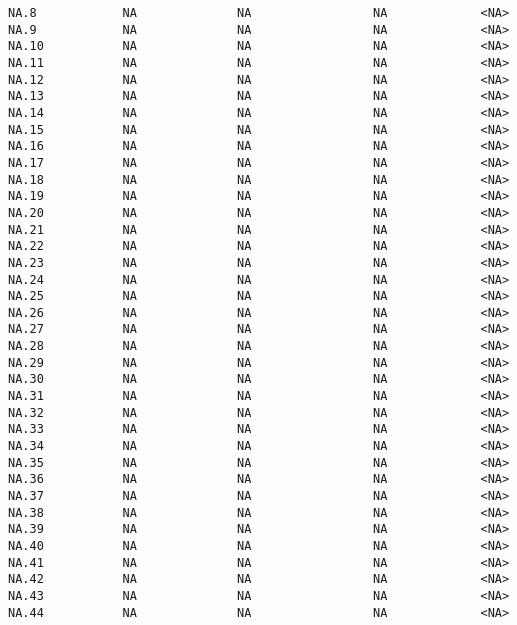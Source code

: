 \documentclass[
  letterpaper,
  DIV=11,
  numbers=noendperiod]{scrartcl}
\begin{document}
\begin{verbatim}
NA.8            NA              NA                 NA             <NA>
NA.9            NA              NA                 NA             <NA>
NA.10           NA              NA                 NA             <NA>
NA.11           NA              NA                 NA             <NA>
NA.12           NA              NA                 NA             <NA>
NA.13           NA              NA                 NA             <NA>
NA.14           NA              NA                 NA             <NA>
NA.15           NA              NA                 NA             <NA>
NA.16           NA              NA                 NA             <NA>
NA.17           NA              NA                 NA             <NA>
NA.18           NA              NA                 NA             <NA>
NA.19           NA              NA                 NA             <NA>
NA.20           NA              NA                 NA             <NA>
NA.21           NA              NA                 NA             <NA>
NA.22           NA              NA                 NA             <NA>
NA.23           NA              NA                 NA             <NA>
NA.24           NA              NA                 NA             <NA>
NA.25           NA              NA                 NA             <NA>
NA.26           NA              NA                 NA             <NA>
NA.27           NA              NA                 NA             <NA>
NA.28           NA              NA                 NA             <NA>
NA.29           NA              NA                 NA             <NA>
NA.30           NA              NA                 NA             <NA>
NA.31           NA              NA                 NA             <NA>
NA.32           NA              NA                 NA             <NA>
NA.33           NA              NA                 NA             <NA>
NA.34           NA              NA                 NA             <NA>
NA.35           NA              NA                 NA             <NA>
NA.36           NA              NA                 NA             <NA>
NA.37           NA              NA                 NA             <NA>
NA.38           NA              NA                 NA             <NA>
NA.39           NA              NA                 NA             <NA>
NA.40           NA              NA                 NA             <NA>
NA.41           NA              NA                 NA             <NA>
NA.42           NA              NA                 NA             <NA>
NA.43           NA              NA                 NA             <NA>
NA.44           NA              NA                 NA             <NA>

\end{verbatim}
\end{document}
